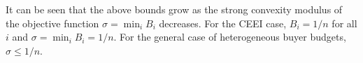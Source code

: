 It can be seen that the above bounds grow as the strong convexity modulus of the objective function $\sigma = \min_i B_i$ decreases.
For the CEEI case, $B_i = 1/n$ for all $i$ and $\sigma = \min_i B_i = 1/n$.
For the general case of heterogeneous buyer budgets, $\sigma \leq 1/n$.


